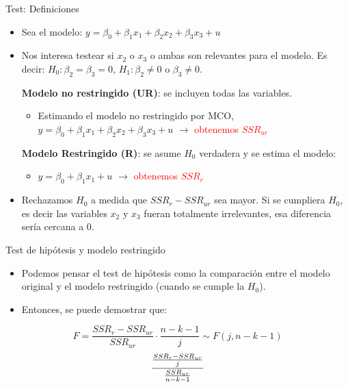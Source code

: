 \documentclass{beamer}
\begin{document}
\begin{frame}[t]{Test: Definiciones}
\begin{itemize}
    \item Sea el modelo: \( y = \beta_0 + \beta_1 x_1 + \beta_2 x_2 + \beta_3 x_3 + u \)
    \item Nos interesa testear si \( x_2 \) o \( x_3 \) o ambas son relevantes para el modelo.
    Es decir: \( H_0: \beta_2 = \beta_3 = 0 \), \( H_1: \beta_2 \neq 0 \) o \( \beta_3 \neq 0 \).

    \textbf{Modelo no restringido (UR)}: se incluyen todas las variables.
    \begin{itemize}
        \item Estimando el modelo no restringido por MCO, \( y = \beta_0 + \beta_1 x_1 + \beta_2 x_2 + \beta_3 x_3 + u \) 
        \(\rightarrow\) \textcolor{red}{obtenemos
\( SSR_{ur} \)}
    \end{itemize}
    
    \textbf{Modelo Restringido (R)}: se asume \( H_0 \) verdadera y se estima el modelo:
    \begin{itemize}
        \item \( y = \beta_0 + \beta_1 x_1 + u \)
        \(\rightarrow\) \textcolor{red}{obtenemos \( SSR_r \)}
    \end{itemize}
    
    \item Rechazamos \( H_0 \) a medida que \( SSR_r - SSR_{ur} \) sea mayor. Si se cumpliera \( H_0 \), es decir las variables \( x_2 \) y \( x_3 \) fueran totalmente irrelevantes, esa diferencia sería cercana a 0.
\end{itemize}
\end{frame}

\begin{frame}[t]{Test de hipótesis y modelo restringido}
    \begin{itemize}
        \item Podemos pensar el test de hipótesis como la comparación entre el modelo
        original y el modelo restringido (cuando se cumple la $H_0$).
        \item Entonces, se puede demostrar que:
    \end{itemize}
    \vspace{0.5cm}
    \[
    F = \frac{SSR_{r} - SSR_{ur}}{SSR_{ur}} \cdot \frac{n - k - 1}{j} \sim F(j, n - k - 1)
    \]
        \[
   { \frac{SSR_r - SSR_{ur}}{j}\over {\frac{SSR_{ur}}{n - k - 1}}}
    \]
\end{frame}
\end{document}
